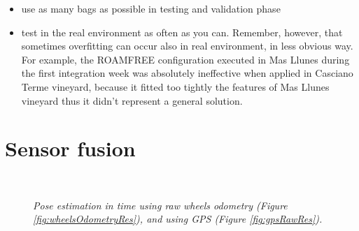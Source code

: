 \begin{enumerate}
\begin{itemize}
	\begin{itemize}
		\item use as many bags as possible in testing and validation phase
		\item test in the real environment as often as you can. Remember, however, that sometimes overfitting can occur also in real environment, in less obvious way. For example, the ROAMFREE configuration executed in Mas Llunes during the first integration week was absolutely ineffective when applied in Casciano Terme vineyard, because it fitted too tightly the features of Mas Llunes vineyard thus it didn't represent a general solution.
	\end{itemize}
\end{itemize}

\end{enumerate}

\section{Sensor fusion}

\begin{figure}
	\centering
	 \\
	\caption{\textit{Pose estimation in time using raw wheels odometry (Figure \ref{fig:wheelsOdometryRes}), and using GPS (Figure \ref{fig:gpsRawRes}).}}
	\label{fig:sensorFusionInputs}
\end{figure}

